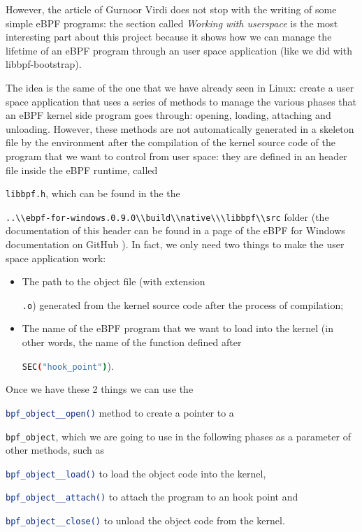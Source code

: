 However, the article of Gurnoor Virdi does not stop with the writing of some simple eBPF programs: the section called \textit{Working with userspace} is the most interesting part about this project because it shows how we can manage the lifetime of an eBPF program through an user space application (like we did with libbpf-bootstrap).

The idea is the same of the one that we have already seen in Linux: create a user space application that uses a series of methods to manage the various phases that an eBPF kernel side program goes through: opening, loading, attaching and unloading.
However, these methods are not automatically generated in a skeleton file by the environment after the compilation of the kernel source code of the program that we want to control from user space: they are defined in an header file inside the eBPF runtime, called \raggedright\colorbox{backcolour}{\lstinline[style=commandline, language=bash]|libbpf.h|}, which can be found in the the \raggedright\colorbox{backcolour}{\lstinline[style=commandline, language=bash]|..\\ebpf-for-windows.0.9.0\\build\\native\\\libbpf\\src|} folder (the documentation of this header can be found in a page of the eBPF for Windows documentation on GitHub \cite{eBPFWinlibbpfHeader}).
In fact, we only need two things to make the user space application work:

\begin{itemize}
	\item 
		The path to the object file (with extension \raggedright\colorbox{backcolour}{\lstinline[style=commandline, language=bash]|.o|}) generated from the kernel source code after the process of compilation;
	\item 
		The name of the eBPF program that we want to load into the kernel (in other words, the name of the function defined after \raggedright\colorbox{backcolour}{\lstinline[style=commandline, language=bash]|SEC("hook_point")|}).
\end{itemize}

Once we have these 2 things we can use the \raggedright\colorbox{backcolour}{\lstinline[style=commandline, language=bash]|bpf_object__open()|} method to create a pointer to a \raggedright\colorbox{backcolour}{\lstinline[style=commandline, language=bash]|bpf_object|}, which we are going to use in the following phases as a parameter of other methods, such as \raggedright\colorbox{backcolour}{\lstinline[style=commandline, language=bash]|bpf_object__load()|} to load the object code into the kernel, \raggedright\colorbox{backcolour}{\lstinline[style=commandline, language=bash]|bpf_object__attach()|} to attach the program to an hook point and \raggedright\colorbox{backcolour}{\lstinline[style=commandline, language=bash]|bpf_object__close()|} to unload the object code from the kernel.

